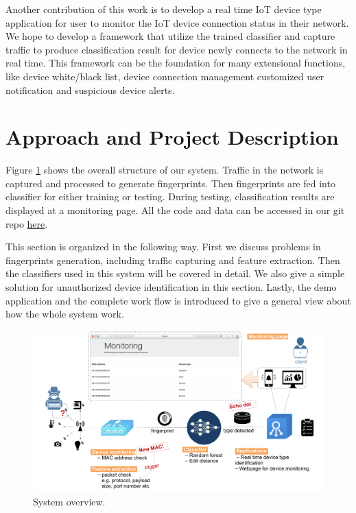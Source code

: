 \documentclass[twocolumn,10pt]{article}
\begin{document}
Another contribution of this work is to develop a real time IoT device type application for user to monitor the IoT device connection status in their network. We hope to develop a framework that utilize the trained classifier and capture traffic to produce classification result for device newly connects to the network in real time. This framework can be the foundation for many extensional functions, like device white/black list, device connection management customized user notification and suspicious device alerts.




\section{Approach and Project Description}

Figure \ref{fig: system overveiw} shows the overall structure of our system. Traffic in the network is captured and processed to generate fingerprints. Then fingerprints are fed into classifier  for either training or testing. During testing, classification results are displayed at a monitoring page. All the code and data can be accessed in our git repo \href{https://github.com/RongzhiWan/18731project}{here}. 

This section is organized in the following way. First we discuss problems in fingerprints generation, including traffic capturing and feature extraction. Then the classifiers used in this system will be covered in detail. We also give a simple solution for unauthorized device identification in this section. Lastly, the demo application and the complete work flow is introduced to give a general view about how the whole system work.



\begin{figure}[h]
  \centering
   \includegraphics[scale=0.3]{system_diagram}
  \caption[System overview]{System overview.}
  \label{fig: system overveiw}
\end{figure}
\end{document}
